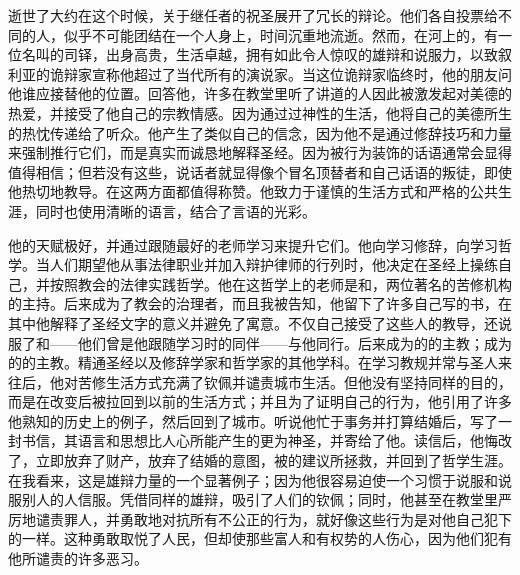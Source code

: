 逝世了大约在这个时候，关于继任者的祝圣展开了冗长的辩论。他们各自投票给不同的人，似乎不可能团结在一个人身上，时间沉重地流逝。然而，在河上的，有一位名叫的司铎，出身高贵，生活卓越，拥有如此令人惊叹的雄辩和说服力，以致叙利亚的诡辩家宣称他超过了当代所有的演说家。当这位诡辩家临终时，他的朋友问他谁应接替他的位置。回答他，许多在教堂里听了讲道的人因此被激发起对美德的热爱，并接受了他自己的宗教情感。因为通过过神性的生活，他将自己的美德所生的热忱传递给了听众。他产生了类似自己的信念，因为他不是通过修辞技巧和力量来强制推行它们，而是真实而诚恳地解释圣经。因为被行为装饰的话语通常会显得值得相信；但若没有这些，说话者就显得像个冒名顶替者和自己话语的叛徒，即使他热切地教导。在这两方面都值得称赞。他致力于谨慎的生活方式和严格的公共生涯，同时也使用清晰的语言，结合了言语的光彩。\par

他的天赋极好，并通过跟随最好的老师学习来提升它们。他向学习修辞，向学习哲学。当人们期望他从事法律职业并加入辩护律师的行列时，他决定在圣经上操练自己，并按照教会的法律实践哲学。他在这哲学上的老师是和，两位著名的苦修机构的主持。后来成为了教会的治理者，而且我被告知，他留下了许多自己写的书，在其中他解释了圣经文字的意义并避免了寓意。不仅自己接受了这些人的教导，还说服了和——他们曾是他跟随学习时的同伴——与他同行。后来成为的的主教；成为的的主教。精通圣经以及修辞学家和哲学家的其他学科。在学习教规并常与圣人来往后，他对苦修生活方式充满了钦佩并谴责城市生活。但他没有坚持同样的目的，而是在改变后被拉回到以前的生活方式；并且为了证明自己的行为，他引用了许多他熟知的历史上的例子，然后回到了城市。听说他忙于事务并打算结婚后，写了一封书信，其语言和思想比人心所能产生的更为神圣，并寄给了他。读信后，他悔改了，立即放弃了财产，放弃了结婚的意图，被的建议所拯救，并回到了哲学生涯。在我看来，这是雄辩力量的一个显著例子；因为他很容易迫使一个习惯于说服和说服别人的人信服。凭借同样的雄辩，吸引了人们的钦佩；同时，他甚至在教堂里严厉地谴责罪人，并勇敢地对抗所有不公正的行为，就好像这些行为是对他自己犯下的一样。这种勇敢取悦了人民，但却使那些富人和有权势的人伤心，因为他们犯有他所谴责的许多恶习。\par

